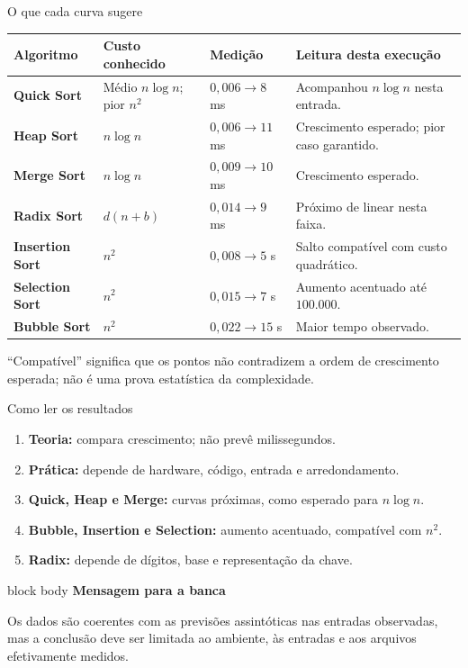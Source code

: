 \documentclass[aspectratio=169,11pt]{beamer}
\newcommand{\softbox}[2]{%
  \begin{beamercolorbox}[wd=\linewidth,sep=.8em,rounded=false]{block body}
    {\bfseries #1}\par\vspace{.25em}#2
  \end{beamercolorbox}
}
\begin{document}
\begin{frame}{O que cada curva sugere}
  \scriptsize
  \begin{tabularx}{\textwidth}{>{\bfseries}p{1.7cm} p{2.1cm} p{2.5cm} X}
    \toprule
    Algoritmo & Custo conhecido & Medição & Leitura desta execução \\
    \midrule
    Quick Sort & Médio \(n\log n\); pior \(n^2\) & \(0,006 \to 8\) ms & Acompanhou \(n\log n\) nesta entrada. \\
    Heap Sort & \(n\log n\) & \(0,006 \to 11\) ms & Crescimento esperado; pior caso garantido. \\
    Merge Sort & \(n\log n\) & \(0,009 \to 10\) ms & Crescimento esperado. \\
    Radix Sort & \(d(n+b)\) & \(0,014 \to 9\) ms & Próximo de linear nesta faixa. \\
    Insertion Sort & \(n^2\) & \(0,008 \to 5\) s & Salto compatível com custo quadrático. \\
    Selection Sort & \(n^2\) & \(0,015 \to 7\) s & Aumento acentuado até \(100.000\). \\
    Bubble Sort & \(n^2\) & \(0,022 \to 15\) s & Maior tempo observado. \\
    \bottomrule
  \end{tabularx}
  \vspace{.1em}
  \tiny ``Compatível'' significa que os pontos não contradizem a ordem de crescimento esperada; não é uma prova estatística da complexidade.
\end{frame}

\begin{frame}{Como ler os resultados}
  \small
  \begin{enumerate}
    \item \textbf{Teoria:} compara crescimento; não prevê milissegundos.
    \item \textbf{Prática:} depende de hardware, código, entrada e arredondamento.
    \item \textbf{Quick, Heap e Merge:} curvas próximas, como esperado para \(n\log n\).
    \item \textbf{Bubble, Insertion e Selection:} aumento acentuado, compatível com \(n^2\).
    \item \textbf{Radix:} depende de dígitos, base e representação da chave.
  \end{enumerate}
  \vspace{.15em}
  \softbox{Mensagem para a banca}{Os dados são coerentes com as previsões assintóticas nas entradas observadas, mas a conclusão deve ser limitada ao ambiente, às entradas e aos arquivos efetivamente medidos.}
\end{frame}
\end{document}
